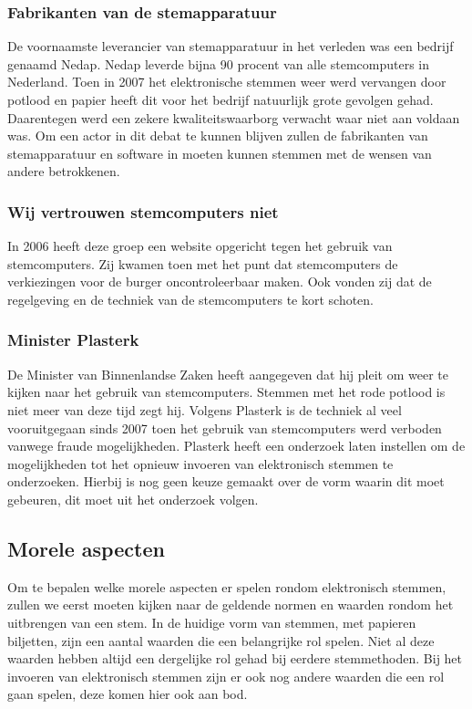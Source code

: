 \documentclass[a4paper]{article}
\begin{document}
\subsubsection{Fabrikanten van de stemapparatuur}
De voornaamste leverancier van stemapparatuur in het verleden was een bedrijf genaamd Nedap.
Nedap leverde bijna 90 procent van alle stemcomputers in Nederland.
Toen in 2007 het elektronische stemmen weer werd vervangen door potlood en papier heeft dit voor het bedrijf natuurlijk grote gevolgen gehad.
Daarentegen werd een zekere kwaliteitswaarborg verwacht waar niet aan voldaan was.
Om een actor in dit debat te kunnen blijven zullen de fabrikanten van stemapparatuur en software in moeten kunnen stemmen met de wensen van andere betrokkenen.

\subsubsection{Wij vertrouwen stemcomputers niet}
In 2006 heeft deze groep een website opgericht tegen het gebruik van stemcomputers. 
Zij kwamen toen met het punt dat stemcomputers de verkiezingen voor de burger oncontroleerbaar maken.
Ook vonden zij dat de regelgeving en de techniek van de stemcomputers te kort schoten.

\subsubsection{Minister Plasterk}
De Minister van Binnenlandse Zaken heeft aangegeven dat hij pleit om weer te kijken naar het gebruik van stemcomputers.
Stemmen met het rode potlood is niet meer van deze tijd zegt hij. 
Volgens Plasterk is de techniek al veel vooruitgegaan sinds 2007 toen het gebruik van stemcomputers werd verboden vanwege fraude mogelijkheden.
Plasterk heeft een onderzoek laten instellen om de mogelijkheden tot het opnieuw invoeren van elektronisch stemmen te onderzoeken.
Hierbij is nog geen keuze gemaakt over de vorm waarin dit moet gebeuren, dit moet uit het onderzoek volgen.

\subsection{Morele aspecten}
\label{text:moreel}
Om te bepalen welke morele aspecten er spelen rondom elektronisch stemmen, zullen we eerst moeten kijken naar de geldende normen en waarden rondom het uitbrengen van een stem.
In de huidige vorm van stemmen, met papieren biljetten, zijn een aantal waarden die een belangrijke rol spelen.
Niet al deze waarden hebben altijd een dergelijke rol gehad bij eerdere stemmethoden.
Bij het invoeren van elektronisch stemmen zijn er ook nog andere waarden die een rol gaan spelen, deze komen hier ook aan bod.
\end{document}
